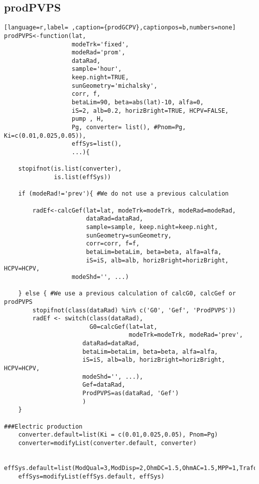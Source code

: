 \subsection{prodPVPS}
\label{sec:orgcf00c68}
\label{subsec:prodpvps}
\begin{lstlisting}[language=r,label= ,caption={prodGCPV},captionpos=b,numbers=none]
prodPVPS<-function(lat, 
                   modeTrk='fixed', 
                   modeRad='prom', 
                   dataRad,
                   sample='hour',
                   keep.night=TRUE,
                   sunGeometry='michalsky',
                   corr, f,
                   betaLim=90, beta=abs(lat)-10, alfa=0,
                   iS=2, alb=0.2, horizBright=TRUE, HCPV=FALSE,
                   pump , H, 
                   Pg, converter= list(), #Pnom=Pg, Ki=c(0.01,0.025,0.05)),
                   effSys=list(),
                   ...){

    stopifnot(is.list(converter),
              is.list(effSys))

    if (modeRad!='prev'){ #We do not use a previous calculation

        radEf<-calcGef(lat=lat, modeTrk=modeTrk, modeRad=modeRad,
                       dataRad=dataRad,
                       sample=sample, keep.night=keep.night,
                       sunGeometry=sunGeometry,
                       corr=corr, f=f,
                       betaLim=betaLim, beta=beta, alfa=alfa,
                       iS=iS, alb=alb, horizBright=horizBright, HCPV=HCPV,
                   modeShd='', ...)

    } else { #We use a previous calculation of calcG0, calcGef or prodPVPS
        stopifnot(class(dataRad) %in% c('G0', 'Gef', 'ProdPVPS'))
        radEf <- switch(class(dataRad),
                        G0=calcGef(lat=lat, 
                                   modeTrk=modeTrk, modeRad='prev',
                      dataRad=dataRad,
                      betaLim=betaLim, beta=beta, alfa=alfa,
                      iS=iS, alb=alb, horizBright=horizBright, HCPV=HCPV,
                      modeShd='', ...),
                      Gef=dataRad,
                      ProdPVPS=as(dataRad, 'Gef')
                      )
    }

###Electric production
    converter.default=list(Ki = c(0.01,0.025,0.05), Pnom=Pg)
    converter=modifyList(converter.default, converter)

    effSys.default=list(ModQual=3,ModDisp=2,OhmDC=1.5,OhmAC=1.5,MPP=1,TrafoMT=1,Disp=0.5)
    effSys=modifyList(effSys.default, effSys)


\end{lstlisting}
